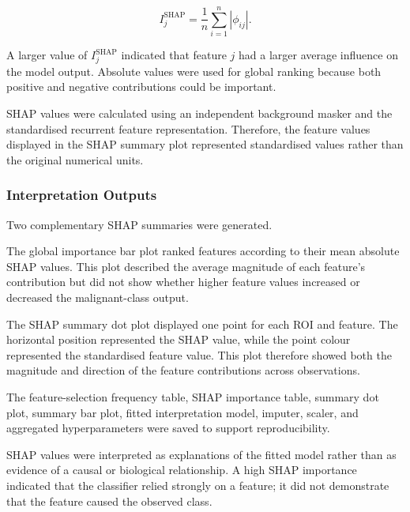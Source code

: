 \documentclass[12pt,twocolumn]{article}
\begin{document}
\begin{equation}
I_j^{\mathrm{SHAP}}
=
\frac{1}{n}
\sum_{i=1}^{n}
\left|
\phi_{ij}
\right|.
\label{eq:mean_absolute_shap}
\end{equation}

A larger value of \(I_j^{\mathrm{SHAP}}\) indicated that feature \(j\)
had a larger average influence on the model output. Absolute values
were used for global ranking because both positive and negative
contributions could be important.

SHAP values were calculated using an independent background masker and
the standardised recurrent feature representation. Therefore, the
feature values displayed in the SHAP summary plot represented
standardised values rather than the original numerical units.








\subsubsection{Interpretation Outputs}
\label{subsubsec:interpretation_outputs}

Two complementary SHAP summaries were generated.

The global importance bar plot ranked features according to their mean
absolute SHAP values. This plot described the average magnitude of each
feature's contribution but did not show whether higher feature values
increased or decreased the malignant-class output.

The SHAP summary dot plot displayed one point for each ROI and feature.
The horizontal position represented the SHAP value, while the point
colour represented the standardised feature value. This plot therefore
showed both the magnitude and direction of the feature contributions
across observations.

The feature-selection frequency table, SHAP importance table, summary
dot plot, summary bar plot, fitted interpretation model, imputer,
scaler, and aggregated hyperparameters were saved to support
reproducibility.

SHAP values were interpreted as explanations of the fitted model rather
than as evidence of a causal or biological relationship. A high SHAP
importance indicated that the classifier relied strongly on a feature;
it did not demonstrate that the feature caused the observed class.
\end{document}
